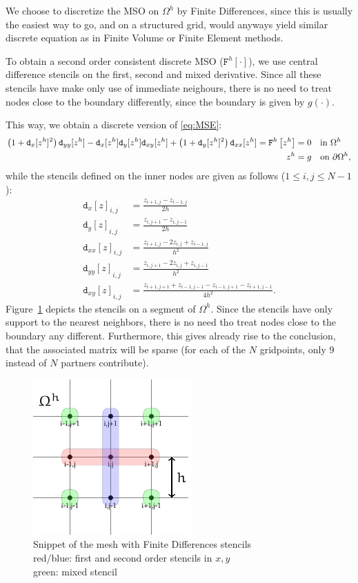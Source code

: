 \documentclass[11pt]{scrartcl}
\newcommand{\mSurfDisc}[1]{\ensuremath{\mathtt{F}^h\left[#1\right]}}
\newcommand{\Dx}[1]{\ensuremath{\mathtt{d}_x[#1]}}
\newcommand{\Dy}[1]{\ensuremath{\mathtt{d}_y[#1]}}
\newcommand{\Dxx}[1]{\ensuremath{\mathtt{d}_{xx}[#1]}}
\newcommand{\Dyy}[1]{\ensuremath{\mathtt{d}_{yy}[#1]}}
\newcommand{\Dxy}[1]{\ensuremath{\mathtt{d}_{xy}[#1]}}
\begin{document}
We choose to discretize the MSO on $\Omega^h$ by Finite Differences, since this is usually the easiest way to go, and on a structured grid, would anyways yield similar discrete equation as in Finite Volume or Finite Element methods.

To obtain a second order consistent discrete MSO (\mSurfDisc{\cdot}), we use central difference stencils on the first, second and mixed derivative. Since all these stencils have make only use of immediate neighours, there is no need to treat nodes close to the boundary differently, since the boundary is given by $g(\cdot)$.

This way, we obtain a discrete version of \eqref{eq:MSE}:
\begin{align}
	\left(1+\Dx{z^h}^2\right)\Dyy{z^h}-\Dx{z^h} \Dy{z^h}\Dxy{z^h} + \left(1+\Dy{z^h}^2\right)\Dxx{z^h} = \mSurfDisc{z^h} &= 0  \quad \text{in } \Omega^h \notag \\
	z^h &= g \quad \text{on } \partial\Omega^h \label{eq:dMSE},
\end{align}
while the stencils defined on the inner nodes are given as follows ($1 \le i,j \le N-1$):
\begin{align}
	\Dx{z}_{i,j} &= \frac{z_{i+1,j}-z_{i-1,j}}{2h}\label{eq:dx} \\
	\Dy{z}_{i,j} &= \frac{z_{i,j+1}-z_{i,j-1}}{2h}\label{eq:dy} \\
	\Dxx{z}_{i,j} &= \frac{z_{i+1,j} - 2z_{i,j} + z_{i-1,j}}{h^2}\label{eq:dxx}\\
	\Dyy{z}_{i,j} &= \frac{z_{i,j+1} - 2z_{i,j} + z_{i,j-1}}{h^2}\label{eq:dyy}\\
	\Dxy{z}_{i,j} &= \frac{z_{i+1,j+1} + z_{i-1,j-1} - z_{i-1,j+1}-z_{i+1,j-1}}{4h^2}\label{eq:dxy}. 
\end{align}
Figure~\ref{fig:fdmmesh} depicts the stencils on a segment of $\Omega^h$.
Since the stencils have only support to the nearest neighbors, there is no need tho treat nodes close to the boundary any different. Furthermore, this gives already rise to the conclusion, that the associated matrix will be sparse (for each of the $N$ gridpoints, only 9 instead of $N$ partners contribute).

\begin{figure}
	\centering
	\includegraphics[width=.4\linewidth]{figs/FDMMesh}
	\caption{Snippet of the mesh with Finite Differences stencils\\red/blue: first and second order stencils in $x,y$\\
	green: mixed stencil}\label{fig:fdmmesh}
\end{figure}
\newpage
\end{document}
